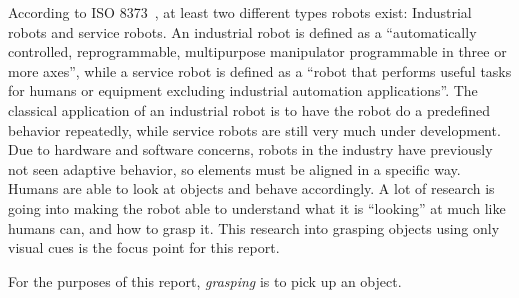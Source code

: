 According to ISO 8373~\cite{detry}, at least two different types robots exist:
Industrial robots and service robots.
An industrial robot is defined as a ``automatically controlled, reprogrammable, multipurpose manipulator programmable in three or more axes'',
while a service robot is defined as a ``robot that performs useful tasks for humans or equipment excluding industrial automation applications''.
The classical application of an industrial robot is to have the robot do a predefined behavior repeatedly,
while service robots are still very much under development.
Due to hardware and software concerns, robots in the industry have previously not seen adaptive behavior,
so elements must be aligned in a specific way. Humans are able to look at objects and behave accordingly.
A lot of research is going into making the robot able to understand what it is ``looking'' at much like humans can,
and how to grasp it. This research into grasping objects using only visual cues is the focus point for this report.

For the purposes of this report, \emph{grasping} is to pick up an object.
